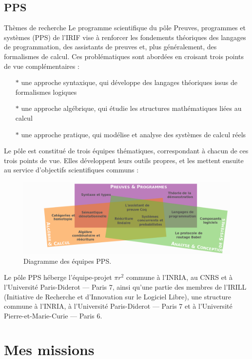 \documentclass{article}
\begin{document}
\subsection{PPS}

Thèmes de recherche
\newline\newline
Le programme scientifique du pôle Preuves, programmes et systèmes (PPS) de l'IRIF vise à renforcer les fondements théoriques des langages de programmation, des assistants de preuves et, plus généralement, des formalismes de calcul. Ces problématiques sont abordées en croisant trois points de vue complémentaires :
\begin{itemize}
	\item[$\ast$]une approche syntaxique, qui développe des langages théoriques issus de formalismes logiques
    \item[$\ast$]une approche algébrique, qui étudie les structures mathématiques liées au calcul
	\item[$\ast$]une approche pratique, qui modélise et analyse des systèmes de calcul réels
\end{itemize}
Le pôle est constitué de trois équipes thématiques, correspondant à chacun de ces trois points de vue. Elles développent leurs outils propres, et les mettent ensuite au service d'objectifs scientifiques communs :
\begin{figure}[h!]
	\includegraphics[width=\linewidth]{PPS.png}
	\caption{Diagramme des équipes PPS.}
\end{figure}
\newline
Le pôle PPS héberge l'équipe-projet \begin{math}\pi r^2\end{math} commune à l'INRIA, au CNRS et à l'Université Paris-Diderot — Paris 7, ainsi qu'une partie des membres de l'IRILL (Initiative de Recherche et d'Innovation sur le Logiciel Libre), une structure commune à l'INRIA, à l'Université Paris-Diderot — Paris 7 et à l'Université Pierre-et-Marie-Curie — Paris 6. 
\newpage
\section{Mes missions}
\end{document}
